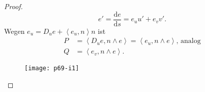 \begin{theorem}
\begin{proof}
    \begin{minipage}{.6\textwidth}
      \begin{equation*}
        e' = \frac{\text{d}e}{\text{d}s} = e_uu' + e_vv'\text{.}
      \end{equation*}
      Wegen $ e_u = D_ue + \left\langle e_u,n \right\rangle n $ ist
      \begin{align*}
        P &= \left\langle D_ue, n \wedge e \right\rangle = \left\langle e_u, n \wedge e \right\rangle\text{, analog} \\
        Q &= \left\langle e_v, n \wedge e \right\rangle\text{.}
      \end{align*}
    \end{minipage}
    \hfill
    \begin{minipage}{.375\textwidth}
      \begin{figure}[H]
        \texttt{[image: p69-i1]}
      \end{figure}
      \vspace*{0.5em}
    \end{minipage}


\end{proof}
\end{theorem}
